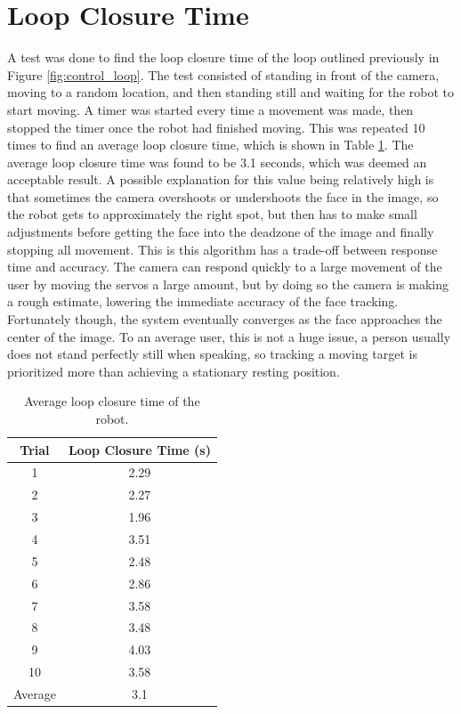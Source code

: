 \section{Loop Closure Time}
A test was done to find the loop closure time of the loop outlined previously in Figure \ref{fig:control_loop}. The test consisted of standing in front of the camera, moving to a random location, and then standing still and waiting for the robot to start moving. A timer was started every time a movement was made, then stopped the timer once the robot had finished moving. This was repeated 10 times to find an average loop closure time, which is shown in Table \ref{loop-closure-time}. The average loop closure time was found to be 3.1 seconds, which was deemed an acceptable result. A possible explanation for this value being relatively high is that sometimes the camera overshoots or undershoots the face in the image, so the robot gets to approximately the right spot, but then has to make small adjustments before getting the face into the deadzone of the image and finally stopping all movement. This is this algorithm has a trade-off between response time and accuracy. The camera can respond quickly to a large movement of the user by moving the servos a large amount, but by doing so the camera is making a rough estimate, lowering the immediate accuracy of the face tracking. Fortunately though, the system eventually converges as the face approaches the center of the image. To an average user, this is not a huge issue, a person usually does not stand perfectly still when speaking, so tracking a moving target is prioritized more than achieving a stationary resting position.

\begin{table}[h]
    \centering
    \begin{tabular}{c|c}
    Trial & Loop Closure Time (s)\\
    \hline
    1&2.29\\
    2&2.27\\
    3&1.96\\
    4&3.51\\
    5&2.48\\
    6&2.86\\
    7&3.58\\
    8&3.48\\
    9&4.03\\
    10&3.58  \\
    \hline
    Average & 3.1
    \end{tabular}
    \caption{Average loop closure time of the robot.}
    \label{loop-closure-time}
\end{table}

